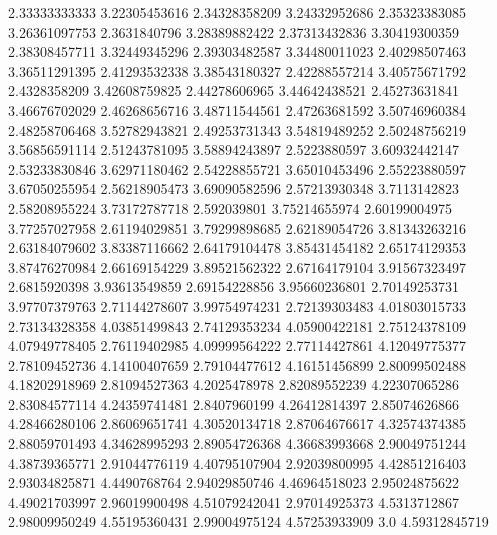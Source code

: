   2.33333333333    3.22305453616
  2.34328358209    3.24332952686
  2.35323383085    3.26361097753
   2.3631840796    3.28389882422
  2.37313432836    3.30419300359
  2.38308457711    3.32449345296
  2.39303482587    3.34480011023
  2.40298507463    3.36511291395
  2.41293532338    3.38543180327
  2.42288557214    3.40575671792
   2.4328358209    3.42608759825
  2.44278606965    3.44642438521
  2.45273631841    3.46676702029
  2.46268656716    3.48711544561
  2.47263681592    3.50746960384
  2.48258706468    3.52782943821
  2.49253731343    3.54819489252
  2.50248756219    3.56856591114
  2.51243781095    3.58894243897
   2.5223880597    3.60932442147
  2.53233830846    3.62971180462
  2.54228855721    3.65010453496
  2.55223880597    3.67050255954
  2.56218905473    3.69090582596
  2.57213930348     3.7113142823
  2.58208955224    3.73172787718
    2.592039801    3.75214655974
  2.60199004975    3.77257027958
  2.61194029851    3.79299898685
  2.62189054726    3.81343263216
  2.63184079602    3.83387116662
  2.64179104478    3.85431454182
  2.65174129353    3.87476270984
  2.66169154229    3.89521562322
  2.67164179104    3.91567323497
   2.6815920398    3.93613549859
  2.69154228856    3.95660236801
  2.70149253731    3.97707379763
  2.71144278607    3.99754974231
  2.72139303483    4.01803015733
  2.73134328358    4.03851499843
  2.74129353234    4.05900422181
  2.75124378109    4.07949778405
  2.76119402985    4.09999564222
  2.77114427861    4.12049775377
  2.78109452736    4.14100407659
  2.79104477612    4.16151456899
  2.80099502488    4.18202918969
  2.81094527363     4.2025478978
  2.82089552239    4.22307065286
  2.83084577114    4.24359741481
   2.8407960199    4.26412814397
  2.85074626866    4.28466280106
  2.86069651741    4.30520134718
  2.87064676617    4.32574374385
  2.88059701493    4.34628995293
  2.89054726368    4.36683993668
  2.90049751244    4.38739365771
  2.91044776119    4.40795107904
  2.92039800995    4.42851216403
  2.93034825871     4.4490768764
  2.94029850746    4.46964518023
  2.95024875622    4.49021703997
  2.96019900498    4.51079242041
  2.97014925373     4.5313712867
  2.98009950249    4.55195360431
  2.99004975124    4.57253933909
            3.0    4.59312845719
